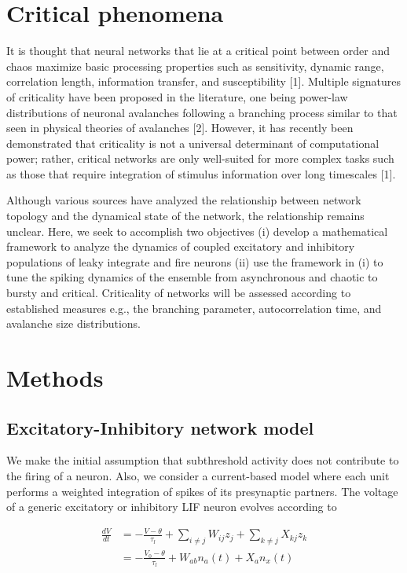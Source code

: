 \documentclass{article} %
\begin{document}
\section{Critical phenomena}

It is thought that neural networks that lie at a critical point between order and chaos maximize basic processing properties such as sensitivity, dynamic range, correlation length, information transfer, and susceptibility [1]. Multiple signatures of criticality have been proposed in the literature, one being power-law distributions of neuronal avalanches following a branching process similar to that seen in physical theories of avalanches [2]. However, it has recently been demonstrated that criticality is not a universal determinant of computational power; rather, critical networks are only well-suited for more complex tasks such as those that require integration of stimulus information over long timescales [1]. 

Although various sources have analyzed the relationship between network topology and the dynamical state of the network, the relationship remains unclear. Here, we seek to accomplish two objectives (i) develop a mathematical framework to analyze the dynamics of coupled excitatory and inhibitory populations of leaky integrate and fire neurons (ii) use the framework in (i) to tune the spiking dynamics of the ensemble from asynchronous and chaotic to bursty and critical. Criticality of networks will be assessed according to established measures e.g., the branching parameter, autocorrelation time, and avalanche size distributions. 

\section{Methods}


\subsection{Excitatory-Inhibitory network model}

We make the initial assumption that subthreshold activity does not contribute to the firing of a neuron. Also, we consider a current-based model where each unit performs a weighted integration of spikes of its presynaptic partners. The voltage of a generic excitatory or inhibitory LIF neuron evolves according to

\begin{align*}
\frac{dV}{dt} &= -\frac{V-\theta}{\tau_{l}} + \sum_{i \neq j}W_{ij}z_{j} + \sum_{k \neq j} X_{kj}z_{k}\\
&= -\frac{V_{0}-\theta}{\tau_{l}} + W_{ab}n_{a}(t) + X_{a}n_{x}(t)\\
\end{align*}
\end{document}
